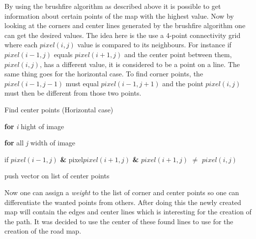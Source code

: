 \documentclass[../Head/Main.tex]{subfiles}
\begin{document}
By using the brushfire algorithm as described above it is possible to get information about certain points of the map with the highest value. Now by looking at the corners and center lines generated by the brushfire algorithm one can get the desired values. The idea here is the use a 4-point connectivity grid where each $pixel(i,j)$ value is compared to its neighbours. For instance if $pixel(i-1,j)$ equals $pixel(i+1,j)$ and the center point between them, $pixel(i,j)$, has a different value, it is considered to be a point on a line. The same thing goes for the horizontal case. To find corner points, the $pixel(i-1,j-1)$ must equal $pixel(i-1,j+1)$ and the point $pixel(i,j)$ must then be different from those two points.

\begin{Pseudo}{Find center points (Horizontal case)}{}

 	\textbf{for} \textit{i} hight of image 
	\begin{Indentation}
		\item 
	\begin{Indentation}
	\item \textbf{for} all \textit{j} width of image 
	\item if $pixel(i-1,j)$ \textbf{\&} pixel$pixel(i+1,j)$ \textbf{\&} $pixel(i+1,j)$ $\neq$ $pixel(i,j)$ 
	\item push vector on list of center points
	\end{Indentation}
	
	
	\end{Indentation}
	
\end{Pseudo}
   
Now one can assign a \textit{weight} to the list of corner and center points so one can differentiate the wanted points from others. After doing this the newly created map will contain the edges and center lines which is interesting for the creation of the path. It was decided to use the center of these found lines to use for the creation of the road map.  
\end{document}
